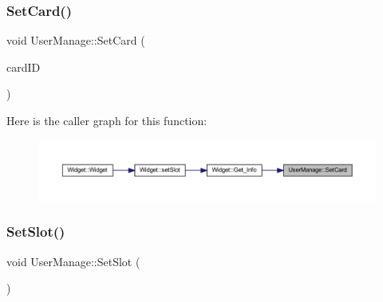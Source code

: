 \subsubsection{\texorpdfstring{SetCard()}{SetCard()}}
{\footnotesize\ttfamily void User\+Manage\+::\+Set\+Card (\begin{DoxyParamCaption}\item[{Q\+String}]{card\+ID }\end{DoxyParamCaption})}

Here is the caller graph for this function\+:
\nopagebreak
\begin{figure}[H]
\begin{center}
\leavevmode
\includegraphics[width=350pt]{class_user_manage_ab4b39d4a967fc173c0a5ae5d3e2f2ef8_icgraph}
\end{center}
\end{figure}
\mbox{\label{class_user_manage_aa838d49f063bc0a081a1eb4d967c2da3}} 
\subsubsection{\texorpdfstring{SetSlot()}{SetSlot()}}
{\footnotesize\ttfamily void User\+Manage\+::\+Set\+Slot (\begin{DoxyParamCaption}{ }\end{DoxyParamCaption})}

